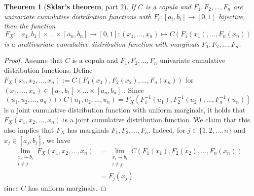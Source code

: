 \documentclass{article}
\newtheorem{theorem}{Theorem}
\begin{document}
\begin{theorem}[\textbf{Sklar's theorem}, part 2]\cite[Theorem 2]{Copulas}\label{Sklar's theorem 2.0}
    If $C$ is a copula and $F_1,F_2,\dots,F_n$ are univariate cumulative distribution functions with $F_i:[a_i,b_i] \rightarrow[0,1]$ bijective, then the function 
    $$F_{\underline{X}}:[a_1,b_1]\times \dots \times [a_n,b_n] \rightarrow [0,1]:(x_1,\dots,x_n) \mapsto C(F_1(x_1),\dots,F_n(x_n))$$
    is a multivariate cumulative distribution function with marginals $F_1,F_2,\dots,F_n$.
\end{theorem}
\begin{proof}
    Assume that $C$ is a copula and $F_1,F_2,\dots,F_n$ univariate cumulative distribution functions. Define $F_{\underline{X}}(x_1,x_2,\dots,x_n) := C(F_1(x_1),F_2(x_2),\dots,F_n(x_n))$ for $(x_1,\dots,x_n)\in [a_1,b_1]\times \dots \times [a_n,b_n]$ . Since 
    $$(u_1,u_2,\dots,u_n)\mapsto C(u_1,u_2,\dots,u_n) = F_{\underline{X}}(F_1^{-1}(u_1),F_2^{-1}(u_2),\dots,F_n^{-1}(u_n))$$ 
    is a joint cumulative distribution function with uniform marginals, it holds that
    $F_{\underline{X}}(x_1,x_2,\dots,x_n)$ is a joint cumulative distribution function. We claim that this also implies that $F_{\underline{X}}$ has marginals $F_1,F_2,\dots,F_n$. Indeed, for $j\in \{1,2,\dots,n\}$ and $x_j\in [a_j,b_j]$, we have
    \begin{align*}
    \lim_{\substack{x_i \to b_i \\ i \neq j}} F_{\underline{X}}(x_1,x_2,\dots,x_n) &= \lim_{\substack{x_i \to b_i \\ i \neq j}} C(F_1(x_1),F_2(x_2),\dots,F_n(x_n))\\
    &= F_j(x_j)
    \end{align*}
    since $C$ has uniform marginals.
\end{proof}
\end{document}
